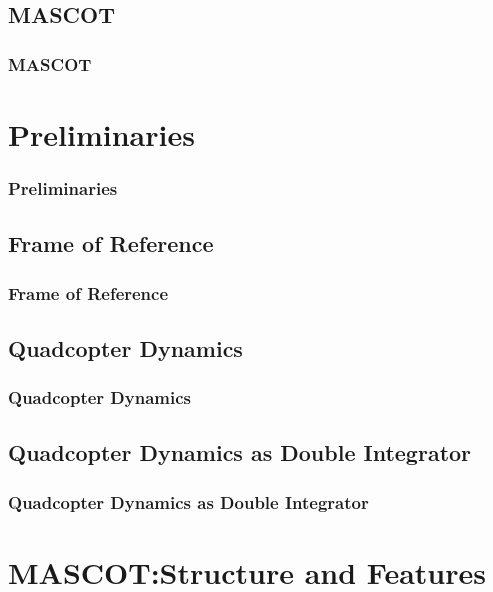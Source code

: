 \documentclass[10pt]{beamer}
\begin{document}
\subsection{MASCOT}

\begin{frame}
\frametitle{MASCOT}

\end{frame}
\section{Preliminaries}
\begin{frame}
\frametitle{Preliminaries}
\end{frame}
\subsection{Frame of Reference}
\begin{frame}
\frametitle{Frame of Reference}
\end{frame}
\subsection{Quadcopter Dynamics}
\begin{frame}
\frametitle{Quadcopter Dynamics}
\end{frame}
\subsection{Quadcopter Dynamics as Double Integrator}
\begin{frame}
\frametitle{Quadcopter Dynamics as Double Integrator}
\end{frame}
\section{MASCOT:Structure and Features}
\end{document}
